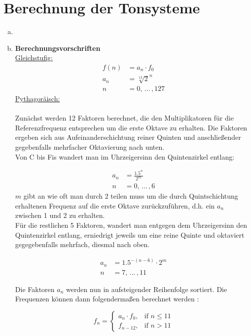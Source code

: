 \chapter{Berechnung der Tonsysteme}

\begin{enumerate}[a)]
\item

\item
\textbf{Berechnungsvorschriften} \\

\underline{Gleichstufig:}
\\
\begin{align*}
    f(n) &= a_n \cdot f_0 \\ 
    a_n &= \sqrt[12]{2}^n \\
    n &= 0, \,... \, ,127
\end{align*} 
\underline{Pythagoräisch:}
\\
\\
Zunächst werden 12 Faktoren berechnet, die den Multiplikatoren für die Referenzfrequenz entsprechen um die erste Oktave zu erhalten.
Die Faktoren ergeben sich aus Aufeinanderschichtung reiner Quinten und anschließender gegebenfalls mehrfacher Oktavierung nach unten.
\\
Von C bis Fis wandert man im Uhrzeigersinn den Quintenzirkel entlang:

\begin{align*}
    a_n &= \frac{1.5^n}{2^m} \\
    n &= 0,  \,... \, ,6
\end{align*} 
$m$ gibt an wie oft man durch 2 teilen muss um die durch Quintschichtung erhaltenen Frequenz auf die erste Oktave zurückzuführen, d.h. ein $a_n$ zwischen 1 und 2 zu erhalten.
\\

Für die restlichen 5 Faktoren, wandert man entgegen dem Uhrzeigersinn den Quintenzirkel entlang, erniedrigt jeweils um eine reine Quinte und oktaviert gegegebenfalls mehrfach, diesmal nach oben.

\begin{align*}
    a_n &= 1.5^{-(n-6)} \cdot 2^m \\
    n &= 7, \, ... \, ,11 
\end{align*}

Die Faktoren $a_n$ werden nun in aufsteigender Reihenfolge sortiert. Die Frequenzen können dann folgendermaßen berechnet werden :

\[
    f_n = 
\begin{cases}
    a_n \cdot f_0,& \text{if } n\leq 11 \\
    f_{n-12},&\text{if } n> 11
\end{cases}  
\]





\end{enumerate}